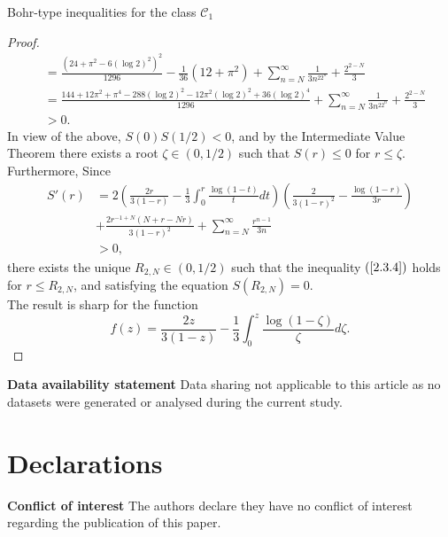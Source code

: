 \documentclass[12pt,a4paper,reqno]{amsart}
\theoremstyle{definition}
\theoremstyle{plain}
\numberwithin{equation}{section}
\begin{document}
\begin{section}{Bohr-type inequalities for the class $\mathcal{C}_1$}
\begin{proof}
\begin{align*}
&=\frac{\left(24+\pi ^2-6 (\log2)^2\right)^2}{1296}-\frac{1}{36} \left(12+\pi ^2\right)+ \sum_{n=N}^{\infty}  \frac{1}{3n^22^n}  +\frac{2^{2-N}}{3}\\
&=\frac{144+12 \pi ^2+\pi ^4-288 (\log2)^2-12 \pi ^2 (\log2)^2+36 (\log2)^4}{1296}+ \sum_{n=N}^{\infty}  \frac{1}{3n^22^n}  +\frac{2^{2-N}}{3}\\
&>0.
\end{align*}
In view of the above, $S(0)S(1/2)<0$, and by the  Intermediate Value Theorem there exists a root $\zeta\in(0, 1/2)$ such that $S(r)\leq 0$ for $r\leq \zeta$. Furthermore, Since
\begin{align*}
S'(r)&=2\left( \frac{2r}{3(1-r)}-\frac{1}{3} \int_{0}^{r} \frac{\log(1-t)}{t} dt \right)\left(\frac{2}{3 (1-r)^2}-\frac{\log(1-r)}{3 r}\right)\\
&+\frac{2 r^{-1+N} (N+r-N r)}{3 (1-r)^2}+\sum_{n=N}^{\infty}   \frac{r^{n-1}}{3n}\\
&>0,
\end{align*}
there exists the unique $ R_{2,N}\in(0, 1/2)$ such that the inequality $(\ref{2.3.4})$ holds for $r \le R_{2,N}$, and satisfying the equation $S( R_{2,N})=0.$
\\
\noindent
The result is sharp for the function
\begin{equation*}
   f(z)= \frac{2z}{3(1-z)} - \frac{1}{3} \int_{0}^{z} \frac{\log(1-\zeta)}{\zeta} d\zeta.
\end{equation*}
\end{proof}

\end{section}


\noindent
\textbf{Data availability statement} Data sharing not applicable to this article as no
datasets were generated or analysed during the current study.
%

%

\section*{Declarations}

%
\noindent
\textbf{Conflict of interest}  The authors declare they have no conflict of interest regarding the publication of this paper.
\end{document}
